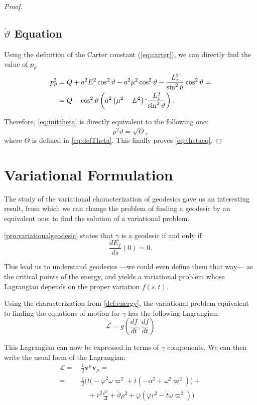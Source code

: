 \begin{proof}
	\subsection*{$\dot{\vartheta}$ Equation}
	
	Using the definition of the Carter constant (\autoref{eq:carter}), we can directly find the value of $p_\vartheta$
	\begin{align}
	p_\vartheta^2 &= Q + a^2E^2\cos^2\vartheta - a^2\mu^2\cos^2\vartheta - \frac{L_z^2}{\sin^2\vartheta}\cos^2\vartheta = \\
	&= Q - \cos^2\vartheta\left( a^2\left(\mu^2 - E^2 \right) `\frac{L_z^2}{\sin^2\vartheta} \right).
	\end{align}
	
	Therefore, \autoref{eq:inittheta} is directly equivalent to the following one:
	\begin{equation}
	\rho^2 \dot{\vartheta} = \sqrt{\Theta},
	\end{equation}
	where $\Theta$ is defined in \autoref{eq:defTheta}. This finally proves \autoref{eq:thetaeq}.
\end{proof}

	
\section{Variational Formulation}
\label{sec:variational}

The study of the variational characterization of geodesics gave us an interesting result, from which we can change the problem of finding a geodesic by an equivalent one: to find the solution of a variational problem.

\autoref{pro:variationalgeodesic} states that $\gamma$ is a geodesic if and only if
\[
\frac{dE_f}{ds}(0) = 0.
\]

This lead us to understand geodesics ---we could even define them that way--- as the critical points of the energy, and yields a variational problem whose Lagrangian depends on the proper variation $f(s,t)$.

Using the characterization from \autoref{def:energy}, the variational problem equivalent to finding the equations of motion for $\gamma$ has the following Lagrangian:
\begin{equation}
	\label{eq:1stlagrangian}
	\mathcal{L} = g\left( \frac{df}{dt}, \frac{df}{dt} \right)
\end{equation}

This Lagrangian can now be expressed in terms of $\gamma$ components. We can then write the usual form of the Lagrangian:
\begin{align}
\mathcal{L} =\,& \frac{1}{2} \mathbf{v}^\mu \mathbf{v}_\mu = \\
=\,& \frac{1}{2} \Biggl( \dot{t}\biggl( -\dot{\varphi}^2\omega\varpi^2 + \dot{t} \left( -\alpha^2 + \omega^2\varpi^2 \right) \biggr) +\\
&\quad + \dot{r}^2\frac{\rho^2}{\Delta} + \dot{\vartheta}\rho^2 + \dot{\varphi}\left( \dot{\varphi} r^2 - \dot{t} \omega \varpi^2 \right) \Biggr)
\end{align}

